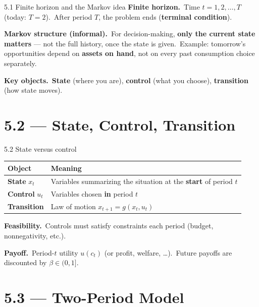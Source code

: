 \documentclass[11pt,aspectratio=169]{beamer}
\begin{document}
\begin{frame}{5.1 Finite horizon and the Markov idea}
  \small
  \textbf{Finite horizon.}\
  Time $t=1,2,\ldots,T$ (today: $T=2$).\
  After period $T$, the problem ends (\textbf{terminal condition}).

  \medskip
  \textbf{Markov structure (informal).}\
  For decision-making, \textbf{only the current state matters} --- not the full history, once the state is given.\
  Example: tomorrow's opportunities depend on \textbf{assets on hand}, not on every past consumption choice separately.

  \medskip
  \textbf{Key objects.}\
  \textbf{State} (where you are), \textbf{control} (what you choose), \textbf{transition} (how state moves).
\end{frame}

\section{5.2 --- State, Control, Transition}

\begin{frame}{5.2 State versus control}
  \small
  \begin{tabular}{@{}ll@{}}
    \toprule
    \textbf{Object} & \textbf{Meaning} \\
    \midrule
    \textbf{State} $x_t$ & Variables summarizing the situation at the \textbf{start} of period $t$ \\
    \textbf{Control} $u_t$ & Variables chosen \textbf{in} period $t$ \\
    \textbf{Transition} & Law of motion $x_{t+1}=g(x_t,u_t)$ \\
    \bottomrule
  \end{tabular}

  \medskip
  \textbf{Feasibility.}\
  Controls must satisfy constraints each period (budget, nonnegativity, etc.).

  \medskip
  \textbf{Payoff.}\
  Period-$t$ utility $u(c_t)$ (or profit, welfare, \ldots).\
  Future payoffs are discounted by $\beta\in(0,1]$.
\end{frame}

\section{5.3 --- Two-Period Model}
\end{document}
